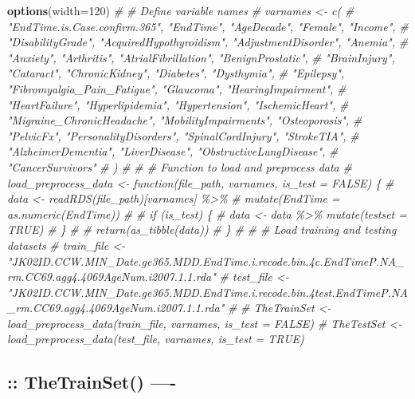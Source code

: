 \documentclass[
]{article}
\newenvironment{Shaded}{\begin{snugshade}}{\end{snugshade}}
\newcommand{\AttributeTok}[1]{\textcolor[rgb]{0.13,0.29,0.53}{#1}}
\newcommand{\CommentTok}[1]{\textcolor[rgb]{0.56,0.35,0.01}{\textit{#1}}}
\newcommand{\DecValTok}[1]{\textcolor[rgb]{0.00,0.00,0.81}{#1}}
\newcommand{\FunctionTok}[1]{\textcolor[rgb]{0.13,0.29,0.53}{\textbf{#1}}}
\newcommand{\NormalTok}[1]{#1}
\begin{document}
\begin{Shaded}
\begin{Highlighting}[]
\FunctionTok{options}\NormalTok{(}\AttributeTok{width=}\DecValTok{120}\NormalTok{)}
\CommentTok{\# \# Define variable names}
\CommentTok{\# varnames \textless{}{-} c(}
\CommentTok{\#   "EndTime.is.Case.confirm.365", "EndTime", "AgeDecade", "Female", "Income",}
\CommentTok{\#   "DisabilityGrade", "AcquiredHypothyroidism", "AdjustmentDisorder", "Anemia",}
\CommentTok{\#   "Anxiety", "Arthritis", "AtrialFibrillation", "BenignProstatic",}
\CommentTok{\#   "BrainInjury", "Cataract", "ChronicKidney", "Diabetes", "Dysthymia",}
\CommentTok{\#   "Epilepsy", "Fibromyalgia\_Pain\_Fatigue", "Glaucoma", "HearingImpairment",}
\CommentTok{\#   "HeartFailure", "Hyperlipidemia", "Hypertension", "IschemicHeart",}
\CommentTok{\#   "Migraine\_ChronicHeadache", "MobilityImpairments", "Osteoporosis",}
\CommentTok{\#   "PelvicFx", "PersonalityDisorders", "SpinalCordInjury", "StrokeTIA",}
\CommentTok{\#   "AlzheimerDementia", "LiverDisease", "ObstructiveLungDisease",}
\CommentTok{\#   "CancerSurvivors"}
\CommentTok{\# )}
\CommentTok{\# }
\CommentTok{\# \# Function to load and preprocess data}
\CommentTok{\# load\_preprocess\_data \textless{}{-} function(file\_path, varnames, is\_test = FALSE) \{}
\CommentTok{\#   data \textless{}{-} readRDS(file\_path)[varnames] \%\textgreater{}\%}
\CommentTok{\#     mutate(EndTime = as.numeric(EndTime))}
\CommentTok{\#   }
\CommentTok{\#   if (is\_test) \{}
\CommentTok{\#     data \textless{}{-} data \%\textgreater{}\% mutate(testset = TRUE)}
\CommentTok{\#   \}}
\CommentTok{\#   }
\CommentTok{\#   return(as\_tibble(data))}
\CommentTok{\# \}}
\CommentTok{\# }
\CommentTok{\# \# Load training and testing datasets}
\CommentTok{\# train\_file \textless{}{-} "JK02ID.CCW.MIN\_Date.ge365.MDD.EndTime.i.recode.bin.4c.EndTimeP.NA\_rm.CC69.agg4.4069AgeNum.i2007.1.1.rda"}
\CommentTok{\# test\_file \textless{}{-} "JK02ID.CCW.MIN\_Date.ge365.MDD.EndTime.i.recode.bin.4test.EndTimeP.NA\_rm.CC69.agg4.4069AgeNum.i2007.1.1.rda"}
\CommentTok{\# }
\CommentTok{\# TheTrainSet \textless{}{-} load\_preprocess\_data(train\_file, varnames, is\_test = FALSE)}
\CommentTok{\# TheTestSet  \textless{}{-} load\_preprocess\_data(test\_file, varnames, is\_test = TRUE)}
\end{Highlighting}
\end{Shaded}

\hypertarget{thetrainset--}{%
\subsection{:: TheTrainSet() ----}\label{thetrainset--}}
\end{document}
